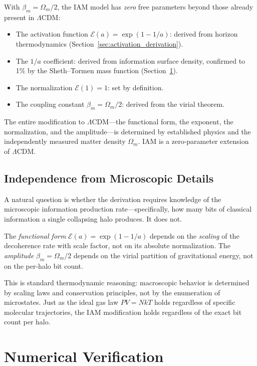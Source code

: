 \documentclass[11pt]{article}
\begin{document}
With $\beta_m = \Omega_m/2$, the IAM model has \textit{zero} free parameters
beyond those already present in $\Lambda$CDM:
\begin{itemize}
\item The activation function $\mathcal{E}(a) = \exp(1-1/a)$: derived from
  horizon thermodynamics (Section~\ref{sec:activation_derivation}).
\item The $1/a$ coefficient: derived from information surface density,
  confirmed to 1\% by the Sheth--Tormen mass function
  (Section~\ref{sec:numerical}).
\item The normalization $\mathcal{E}(1) = 1$: set by definition.
\item The coupling constant $\beta_m = \Omega_m/2$: derived from the virial
  theorem.
\end{itemize}
The entire modification to $\Lambda$CDM---the functional form, the exponent,
the normalization, and the amplitude---is determined by established physics
and the independently measured matter density $\Omega_m$.  IAM is a
zero-parameter extension of $\Lambda$CDM.

\subsection{Independence from Microscopic Details}

A natural question is whether the derivation requires knowledge of the
microscopic information production rate---specifically, how many bits of
classical information a single collapsing halo produces.  It does not.

The \textit{functional form} $\mathcal{E}(a) = \exp(1-1/a)$ depends on the
\textit{scaling} of the decoherence rate with scale factor, not on its
absolute normalization.  The \textit{amplitude} $\beta_m = \Omega_m/2$
depends on the virial partition of gravitational energy, not on the per-halo
bit count.

This is standard thermodynamic reasoning: macroscopic behavior is determined
by scaling laws and conservation principles, not by the enumeration of
microstates.  Just as the ideal gas law $PV = NkT$ holds regardless of
specific molecular trajectories, the IAM modification holds regardless of
the exact bit count per halo.


\section{Numerical Verification}
\label{sec:numerical}
\end{document}
